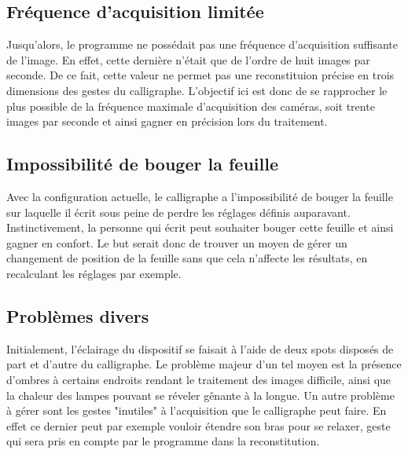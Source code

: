 \subsection{Fréquence d'acquisition limitée}

Jusqu'alors, le programme ne possédait pas une fréquence d'acquisition suffisante de l'image. En effet, cette dernière n'était que de l'ordre de huit images par seconde. De ce fait, cette valeur ne permet pas une reconstituion précise en trois dimensions des gestes du calligraphe. L'objectif ici est donc de se rapprocher le plus possible de la fréquence maximale d'acquisition des caméras, soit trente images par seconde et ainsi gagner en précision lors du traitement.

\subsection{Impossibilité de bouger la feuille}

Avec la configuration actuelle, le calligraphe a l'impossibilité de bouger la feuille sur laquelle il écrit sous peine de perdre les réglages définis auparavant. Instinctivement, la personne qui écrit peut souhaiter bouger cette feuille et ainsi gagner en confort. Le but serait donc de trouver un moyen de gérer un changement de position de la feuille sans que cela n'affecte les résultats, en recalculant les réglages par exemple.

\subsection{Problèmes divers}

Initialement, l'éclairage du dispositif se faisait à l'aide de deux spots disposés de part et d'autre du calligraphe. Le problème majeur d'un tel moyen est la présence d'ombres à certains endroits rendant le traitement des images difficile, ainsi que la chaleur des lampes pouvant se réveler gênante à la longue. Un autre problème à gérer sont les gestes "inutiles" à l'acquisition que le calligraphe peut faire. En effet ce dernier peut par exemple vouloir étendre son bras pour se relaxer, geste qui sera pris en compte par le programme dans la reconstitution.